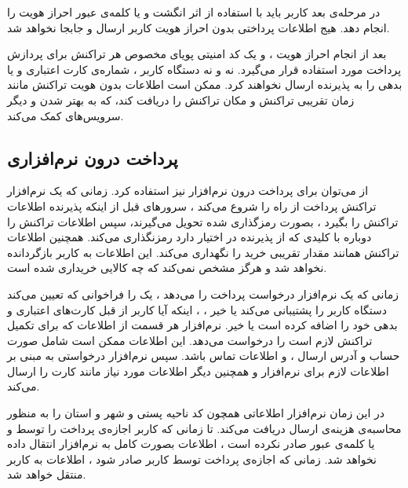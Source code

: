 \documentclass[oneside]{report}
\begin{document}
 در مرحله‌ی بعد کاربر باید با استفاده از اثر انگشت و یا کلمه‌ی عبور احراز هویت را انجام دهد. هیج اطلاعات پرداختی بدون احراز هویت کاربر ارسال و جابجا نخواهد شد. 
 
 بعد از انجام احراز هویت ، 
 {\normalsize {}} 
 و یک  کد امنیتی پویای مخصوص هر تراکنش برای پردازش پرداخت مورد استفاده قرار می‌گیرد. نه 
  {\normalsize {}}
  و نه دستگاه کاربر ، شماره‌ی کارت اعتباری و یا بدهی را به پذیرنده ارسال نخواهند کرد. 
   {\normalsize {}}
   ممکن است اطلاعات بدون هویت تراکنش مانند زمان تقریبی تراکنش و مکان تراکنش را دریافت کند، که به بهتر شدن 
    {\normalsize {}} 
    و دیگر سرویس‌های 
     {\normalsize {}} 
     کمک می‌کند.  
   
   \subsection{پرداخت درون نرم‌افزاری}
از 
     {\normalsize {}}
     می‌توان برای پرداخت درون‌ نرم‌افزار نیز  استفاده کرد.  زمانی که یک نرم‌افزار  تراکنش پرداخت از راه 
      {\normalsize {}} 
      را شروع می‌کند ،  سرورهای 
      {\normalsize {}}
      قبل از اینکه پذیرنده اطلاعات تراکنش را بگیرد ، بصورت رمزگذاری شده تحویل می‌گیرند، سپس 
          {\normalsize {}} 
   اطلاعات تراکنش  را دوباره با کلیدی که از پذیرنده در اختیار دارد رمزنگذاری می‌کند. 
        {\normalsize {}} 
        همچنین اطلاعات  تراکنش همانند مقدار تقریبی خرید را نگهداری می‌کند. این اطلاعات به کاربر بازگردانده نخواهد شد و هرگز مشخص نمی‌کند که چه کالایی خریداری شده‌ است. 
        
زمانی که یک نرم‌افزار درخواست پرداخت را می‌دهد ، یک 
{\normalsize {}} 
    را فراخوانی که تعیین می‌کند دستگاه کاربر 
    {\normalsize {}} 
   را پشتیبانی می‌کند یا خیر ، ، اینکه آیا کاربر از قبل کارت‌های اعتباری و بدهی خود را اضافه کرده است یا خیر.
   نرم‌افزار هر قسمت از اطلاعات که برای تکمیل  تراکنش لازم است  را درخواست می‌دهد. این اطلاعات ممکن است شامل صورت حساب و آدرس ارسال ، و اطلاعات تماس باشد. سپس نرم‌افزار درخواستی به 
   {\normalsize {}} 
   مبنی بر اطلاعات لازم برای نرم‌افزار و همچنین دیگر اطلاعات مورد نیاز مانند کارت را ارسال می‌کند. 

  در این زمان نرم‌افزار اطلاعاتی همچون کد ناحیه پستی و شهر و استان را به منظور محاسبه‌ی هزینه‌ی ارسال دریافت می‌کند. تا زمانی که کاربر اجازه‌ی پرداخت را توسط 
  {\normalsize {}} 
  و یا کلمه‌ی عبور صادر نکرده است ، اطلاعات بصورت کامل به نرم‌افزار انتقال داده نخواهد شد. زمانی که اجازه‌ی 	پرداخت توسط کاربر صادر شود ، اطلاعات به کاربر منتقل خواهد شد. 
  
\end{document}
